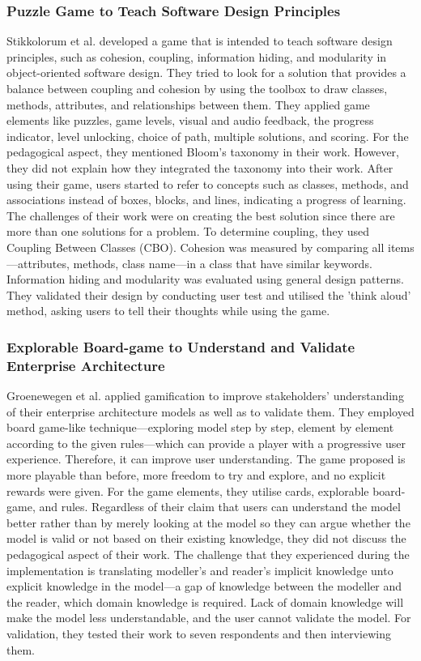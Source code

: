 \documentclass[12pt, a4paper]{report}
\begin{document}
{\subsubsection{Puzzle Game to Teach Software Design Principles}
Stikkolorum et al. \cite{Stikkolorum2014} developed a game that is intended to teach software design principles, such as cohesion, coupling, information hiding, and modularity in object-oriented software design. They tried to look for a solution that provides a balance between coupling and cohesion by using the toolbox to draw classes, methods, attributes, and relationships between them. They applied game elements like puzzles, game levels, visual and audio feedback, the progress indicator, level unlocking, choice of path, multiple solutions, and scoring. For the pedagogical aspect, they mentioned Bloom’s taxonomy in their work. However, they did not explain how they integrated the taxonomy into their work. After using their game, users started to refer to concepts such as classes, methods, and associations instead of boxes, blocks, and lines, indicating a progress of learning. The challenges of their work were on creating the best solution since there are more than one solutions for a problem. To determine coupling, they used Coupling Between Classes (CBO). Cohesion was measured by comparing all items---attributes, methods, class name---in a class that have similar keywords. Information hiding and modularity was evaluated using general design patterns. They validated their design by conducting user test and utilised the 'think aloud' method, asking users to tell their thoughts while using the game. 


\subsubsection{Explorable Board-game to Understand and Validate Enterprise Architecture}
Groenewegen et al. \cite{Groenewegen2010} applied gamification to improve stakeholders' understanding of their enterprise architecture models as well as to validate them. They employed board game-like technique---exploring model step by step, element by element according to the given rules---which can provide a player with a progressive user experience. Therefore, it can improve user understanding. The game proposed is more playable than before, more freedom to try and explore, and no explicit rewards were given. For the game elements, they utilise cards, explorable board-game, and rules. Regardless of their claim that users can understand the model better rather than by merely looking at the model so they can argue whether the model is valid or not based on their existing knowledge, they did not discuss the pedagogical aspect of their work. The challenge that they experienced during the implementation is translating modeller's and reader's implicit knowledge unto explicit knowledge in the model---a gap of knowledge between the modeller and the reader, which domain knowledge is required. Lack of domain knowledge will make the model less understandable, and the user cannot validate the model. For validation, they tested their work to seven respondents and then interviewing them. 

}
\end{document}
